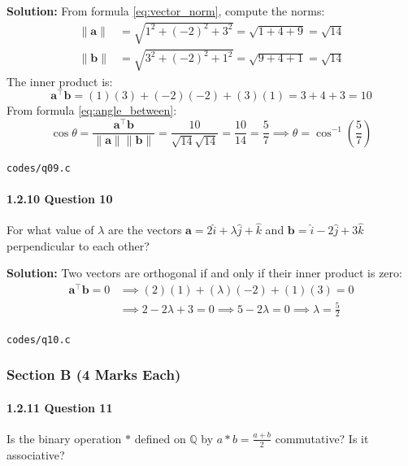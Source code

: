 \documentclass{article}
\begin{document}
\textbf{Solution:} From formula \eqref{eq:vector_norm}, compute the norms:
\begin{align}
\|\mathbf{a}\| &= \sqrt{1^2 + (-2)^2 + 3^2} = \sqrt{1 + 4 + 9} = \sqrt{14} \\
\|\mathbf{b}\| &= \sqrt{3^2 + (-2)^2 + 1^2} = \sqrt{9 + 4 + 1} = \sqrt{14}
\end{align}
The inner product is:
\begin{equation}
\mathbf{a}^\top \mathbf{b} = (1)(3) + (-2)(-2) + (3)(1) = 3 + 4 + 3 = 10
\end{equation}
From formula \eqref{eq:angle_between}:
\begin{equation}
\cos \theta = \frac{\mathbf{a}^\top \mathbf{b}}{\|\mathbf{a}\| \|\mathbf{b}\|} = \frac{10}{\sqrt{14}\sqrt{14}} = \frac{10}{14} = \frac{5}{7} \implies \theta = \cos^{-1}\left(\frac{5}{7}\right)
\end{equation}
\begin{tcolorbox}[colback=gray!10,colframe=black,width=\linewidth]
\texttt{codes/q09.c}
\end{tcolorbox}

\paragraph{1.2.10 Question 10}
For what value of $\lambda$ are the vectors $\mathbf{a} = 2\hat{i} + \lambda\hat{j} + \hat{k}$ and $\mathbf{b} = \hat{i} - 2\hat{j} + 3\hat{k}$ perpendicular to each other?

\textbf{Solution:} Two vectors are orthogonal if and only if their inner product is zero:
\begin{align}
\mathbf{a}^\top \mathbf{b} = 0 &\implies (2)(1) + (\lambda)(-2) + (1)(3) = 0 \\
&\implies 2 - 2\lambda + 3 = 0 \implies 5 - 2\lambda = 0 \implies \lambda = \frac{5}{2}
\end{align}
\begin{tcolorbox}[colback=gray!10,colframe=black,width=\linewidth]
\texttt{codes/q10.c}
\end{tcolorbox}

\newpage
\subsubsection*{Section B (4 Marks Each)}

\paragraph{1.2.11 Question 11}
Is the binary operation $*$ defined on $\mathbb{Q}$ by $a * b = \frac{a + b}{2}$ commutative? Is it associative?
\end{document}
